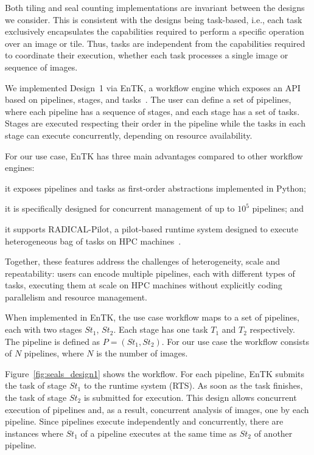 Both tiling and seal counting implementations are invariant between the designs we consider.
This is consistent with the designs being task-based, i.e., each task exclusively encapsulates the capabilities required to perform a specific operation over an image or tile.
Thus, tasks are independent from the capabilities required to coordinate their execution, whether each task processes a single image or sequence of images.

We implemented Design~1 via EnTK, a workflow engine which exposes an API based on pipelines, stages, and tasks~\cite{balasubramanian2018harnessing}.
The user can define a set of pipelines, where each pipeline has a sequence of stages, and each stage has a set of tasks.
Stages are executed respecting their order in the pipeline while the tasks in each stage can execute concurrently, depending on resource availability.

For our use case, EnTK has three main advantages compared to other workflow engines:
\begin{inparaenum}[(1)]
    \item it exposes pipelines and tasks as first-order abstractions implemented in Python;
    \item it is specifically designed for concurrent management of up to $10^5$ pipelines; and
    \item it supports RADICAL-Pilot, a pilot-based runtime system designed to execute heterogeneous bag of tasks on HPC machines~\cite{merzky2019using}.
\end{inparaenum} 
Together, these features address the challenges of heterogeneity, scale and repeatability: users can encode multiple pipelines, each with different types of tasks, executing them at scale on HPC machines without explicitly coding parallelism and resource management.

When implemented in EnTK, the use case workflow maps to a set of pipelines, each with two stages $St_{1}$, $St_{2}$.
Each stage has one task $T_{1}$ and $T_{2}$ respectively.
The pipeline is defined as $P = (St_{1},St_{2})$.
For our use case the workflow consists of $N$ pipelines, where $N$ is the number of images.

Figure~\ref{fig:seals_design1} shows the workflow.
For each pipeline, EnTK submits the task of stage $St_{1}$ to the runtime system (RTS).
As soon as the task finishes, the task of stage $St_{2}$ is submitted for execution.
This design allows concurrent execution of pipelines and, as a result, concurrent analysis of images, one by each pipeline.
Since pipelines execute independently and concurrently, there are instances where $St_{1}$ of a pipeline executes at the same time as $St_{2}$ of another pipeline.

